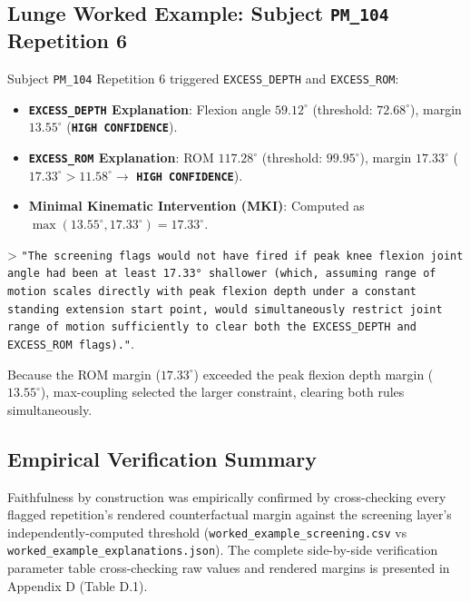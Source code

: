\subsection{Lunge Worked Example: Subject \texttt{PM\_104} Repetition 6}
\label{sec:12-7-2-lunge-worked-example-subject-texttt-pm-104-repetition-6}

Subject \texttt{PM\_104} Repetition 6 triggered \texttt{EXCESS\_DEPTH} and \texttt{EXCESS\_ROM}:
\begin{itemize}
  \item \textbf{\texttt{EXCESS\_DEPTH} Explanation}: Flexion angle $59.12^\circ$ (threshold: $72.68^\circ$), margin \textbf{$13.55^\circ$} (\textbf{\texttt{HIGH CONFIDENCE}}).
  \item \textbf{\texttt{EXCESS\_ROM} Explanation}: ROM $117.28^\circ$ (threshold: $99.95^\circ$), margin \textbf{$17.33^\circ$} ($17.33^\circ > 11.58^\circ \rightarrow$ \textbf{\texttt{HIGH CONFIDENCE}}).
  \item \textbf{Minimal Kinematic Intervention (MKI)}: Computed as $\max(13.55^\circ, 17.33^\circ) = 17.33^\circ$.
\end{itemize}
> \texttt{"The screening flags would not have fired if peak knee flexion joint angle had been at least 17.33° shallower (which, assuming range of motion scales directly with peak flexion depth under a constant standing extension start point, would simultaneously restrict joint range of motion sufficiently to clear both the EXCESS\_DEPTH and EXCESS\_ROM flags)."}.

Because the ROM margin ($17.33^\circ$) exceeded the peak flexion depth margin ($13.55^\circ$), max-coupling selected the larger constraint, clearing both rules simultaneously.

\subsection{Empirical Verification Summary}
\label{sec:12-7-3-empirical-verification-summary}

Faithfulness by construction was empirically confirmed by cross-checking every flagged repetition's rendered counterfactual margin against the screening layer's independently-computed threshold (\texttt{worked\_example\_screening.csv} vs \texttt{worked\_example\_explanations.json}). The complete side-by-side verification parameter table cross-checking raw values and rendered margins is presented in Appendix D (Table D.1).



